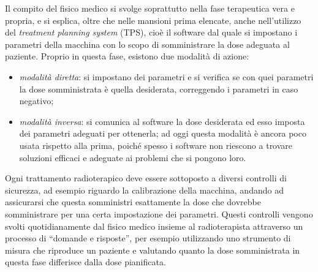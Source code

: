 \documentclass{report}
\newcommand{\virgolette}[1]{``#1''}
\numberwithin{equation}{section}
\numberwithin{figure}{section}
\begin{document}
Il compito del fisico medico si svolge soprattutto nella fase terapeutica vera e propria, e si esplica, oltre che nelle mansioni prima elencate, anche nell'utilizzo del \textit{treatment planning system} (TPS), cioè il software dal quale si impostano i parametri della macchina con lo scopo di somministrare la dose adeguata al paziente. Proprio in questa fase, esistono due modalità di azione:
\begin{itemize}[label=$-$]
    \item \emph{modalità diretta}: si impostano dei parametri e si verifica se con quei parametri la dose somministrata è quella desiderata, correggendo i parametri in caso negativo;
    \item \emph{modalità inversa}: si comunica al software la dose desiderata ed esso imposta dei parametri adeguati per ottenerla; ad oggi questa modalità è ancora poco usata rispetto alla prima, poiché spesso i software non riescono a trovare soluzioni efficaci e adeguate ai problemi che si pongono loro.
\end{itemize}
Ogni trattamento radioterapico deve essere sottoposto a diversi controlli di sicurezza, ad esempio riguardo la calibrazione della macchina, andando ad assicurarsi che questa somministri esattamente la dose che dovrebbe somministrare per una certa impostazione dei parametri. Questi controlli vengono svolti quotidianamente dal fisico medico insieme al radioterapista attraverso un processo di \virgolette{domande e risposte}, per esempio utilizzando uno strumento di misura che riproduce un paziente e valutando quanto la dose somministrata in questa fase differisce dalla dose pianificata.
\end{document}
